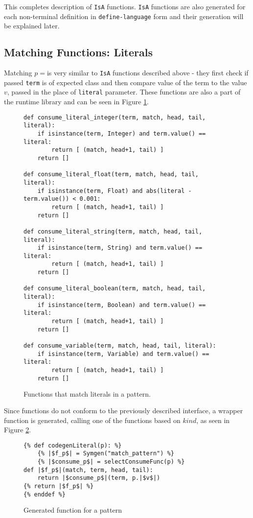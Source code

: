 This completes description of \texttt{IsA} functions. \texttt{IsA} functions are also generated for each non-terminal definition in \texttt{define-language} form and their generation will be explained later.

\subsection{Matching Functions: Literals}
Matching $p=$\LiteralPattern \space is very similar to \texttt{IsA} functions described above - they first check if passed \texttt{term} is of expected class and then compare value of the term to the value $v$, passed in the place of \texttt{literal} parameter. These functions are also a part of the runtime library and can be seen in Figure \ref{codegen-pat-literal}.

\begin{figure}[H]
\begin{verbatim}
def consume_literal_integer(term, match, head, tail, literal):
    if isinstance(term, Integer) and term.value() == literal:
        return [ (match, head+1, tail) ]
    return []

def consume_literal_float(term, match, head, tail, literal):
    if isinstance(term, Float) and abs(literal - term.value()) < 0.001:
        return [ (match, head+1, tail) ]
    return []

def consume_literal_string(term, match, head, tail, literal):
    if isinstance(term, String) and term.value() == literal:
        return [ (match, head+1, tail) ]
    return []

def consume_literal_boolean(term, match, head, tail, literal):
    if isinstance(term, Boolean) and term.value() == literal:
        return [ (match, head+1, tail) ]
    return []

def consume_variable(term, match, head, tail, literal):
    if isinstance(term, Variable) and term.value() == literal:
        return [ (match, head+1, tail) ]
    return []
\end{verbatim}
\caption{Functions that match literals in a pattern.}
\label{codegen-pat-literal}
\end{figure}

Since functions do not conform to the previously described interface, a wrapper function is generated, calling one of the functions based on $kind$, as seen in Figure \ref{codegen-lit-code}.

\begin{figure}[H]
\begin{verbatim}
{% def codegenLiteral(p): %}
	{% |$f_p$| = Symgen("match_pattern") %}
	{% |$consume_p$| = selectConsumeFunc(p) %}
def |$f_p$|(match, term, head, tail):
	return |$consume_p$|(term, p.|$v$|)
{% return |$f_p$| %}
{% enddef %}
\end{verbatim}
\caption{Generated function for a \LiteralPatternNoArg pattern}
\label{codegen-lit-code}
\end{figure}

